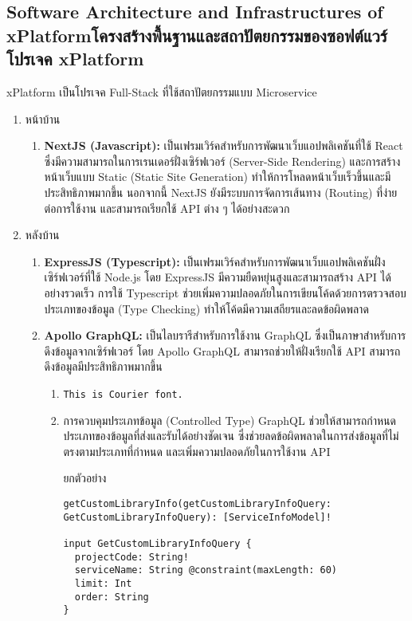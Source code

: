 \subsection{\ifenglish Software Architecture and Infrastructures of xPlatform\else โครงสร้างพื้นฐานและสถาปัตยกรรมของซอฟต์แวร์โปรเจค xPlatform\fi}
xPlatform เป็นโปรเจค Full-Stack ที่ใช้สถาปัตยกรรมแบบ Microservice
\begin{enumerate}
    \item หน้าบ้าน
    \begin{enumerate}
        \item \textbf{NextJS (Javascript):} เป็นเฟรมเวิร์คสำหรับการพัฒนาเว็บแอปพลิเคชันที่ใช้ React ซึ่งมีความสามารถในการเรนเดอร์ฝั่งเซิร์ฟเวอร์ (Server-Side Rendering) และการสร้างหน้าเว็บแบบ Static (Static Site Generation) ทำให้การโหลดหน้าเว็บเร็วขึ้นและมีประสิทธิภาพมากขึ้น นอกจากนี้ NextJS ยังมีระบบการจัดการเส้นทาง (Routing) ที่ง่ายต่อการใช้งาน และสามารถเรียกใช้ API ต่าง ๆ ได้อย่างสะดวก
    \end{enumerate}
    \item หลังบ้าน
    \begin{enumerate}
        \item \textbf{ExpressJS (Typescript):} เป็นเฟรมเวิร์คสำหรับการพัฒนาเว็บแอปพลิเคชันฝั่งเซิร์ฟเวอร์ที่ใช้ Node.js โดย ExpressJS มีความยืดหยุ่นสูงและสามารถสร้าง API ได้อย่างรวดเร็ว การใช้ Typescript ช่วยเพิ่มความปลอดภัยในการเขียนโค้ดด้วยการตรวจสอบประเภทของข้อมูล (Type Checking) ทำให้โค้ดมีความเสถียรและลดข้อผิดพลาด
        \item \textbf{Apollo GraphQL:} เป็นไลบรารีสำหรับการใช้งาน GraphQL ซึ่งเป็นภาษาสำหรับการดึงข้อมูลจากเซิร์ฟเวอร์ โดย Apollo GraphQL สามารถช่วยให้ฝั่งเรียกใช้ API สามารถ ดึงข้อมูลมีประสิทธิภาพมากขึ้น
        \begin{enumerate}
            \item \texttt{This is Courier font.}
            \item การควบคุมประเภทข้อมูล (Controlled Type) GraphQL ช่วยให้สามารถกำหนดประเภทของข้อมูลที่ส่งและรับได้อย่างชัดเจน ซึ่งช่วยลดข้อผิดพลาดในการส่งข้อมูลที่ไม่ตรงตามประเภทที่กำหนด และเพิ่มความปลอดภัยในการใช้งาน API
            
            ยกตัวอย่าง
            \begin{center}                
            \begin{lstlisting}
getCustomLibraryInfo(getCustomLibraryInfoQuery: GetCustomLibraryInfoQuery): [ServiceInfoModel]!

input GetCustomLibraryInfoQuery {
  projectCode: String!
  serviceName: String @constraint(maxLength: 60)
  limit: Int
  order: String
}


\end{lstlisting}
\end{center}
\end{enumerate}
\end{enumerate}
\end{enumerate}

